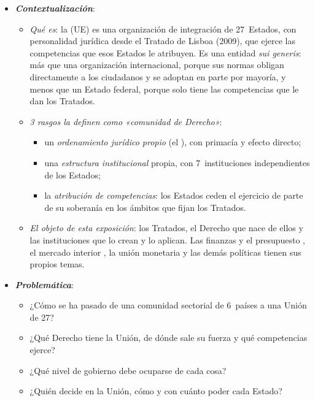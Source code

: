 \documentclass[11pt]{article}
\begin{document}
\begin{itemize}
\item \textbf{\emph{Contextualización}}:
  \begin{itemize}
  \item \emph{Qué es}: la  (UE) es una organización de integración de 27~Estados, con personalidad jurídica desde el Tratado de Lisboa (2009), que ejerce las competencias que esos Estados le atribuyen. Es una entidad \emph{sui generis}: más que una organización internacional, porque sus normas obligan directamente a los ciudadanos y se adoptan en parte por mayoría, y menos que un Estado federal, porque solo tiene las competencias que le dan los Tratados.
  \item \emph{3 rasgos la definen como «comunidad de Derecho»}:
    \begin{itemize}
    \item un \emph{ordenamiento jurídico propio} (el ), con primacía y efecto directo;
    \item una \emph{estructura institucional} propia, con 7~instituciones independientes de los Estados;
    \item la \emph{atribución de competencias}: los Estados ceden el ejercicio de parte de su soberanía en los ámbitos que fijan los Tratados.
    \end{itemize}
  \item \emph{El objeto de esta exposición}: los Tratados, el Derecho que nace de ellos y las instituciones que lo crean y lo aplican. Las finanzas y el presupuesto , el mercado interior , la unión monetaria  y las demás políticas tienen sus propios temas.
  \end{itemize}

\item \textbf{\emph{Problemática}}:
  \begin{itemize}
  \item ¿Cómo se ha pasado de una comunidad sectorial de 6~países a una Unión de 27?
  \item ¿Qué Derecho tiene la Unión, de dónde sale su fuerza y qué competencias ejerce?
  \item ¿Qué nivel de gobierno debe ocuparse de cada cosa?
  \item ¿Quién decide en la Unión, cómo y con cuánto poder cada Estado?
  \end{itemize}


\end{itemize}
\end{document}
